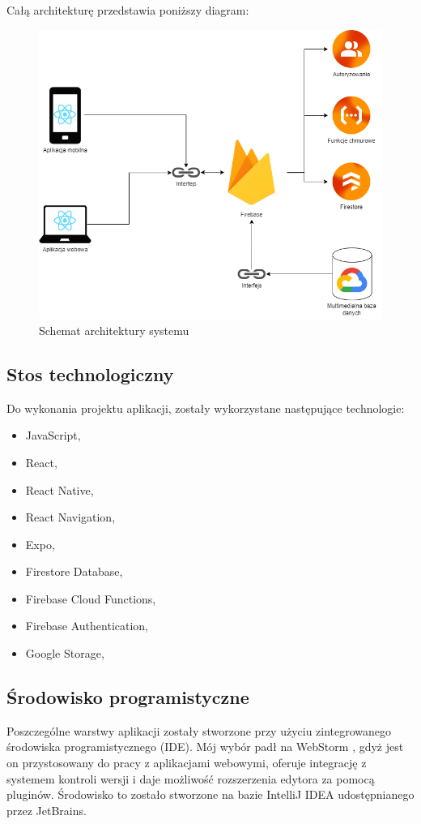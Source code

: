     Całą architekturę przedstawia poniższy diagram:
    
    \begin{figure}[H]
        \centering
        \includegraphics[width=\textwidth]{img/3/architektura.png}
        \caption{Schemat architektury systemu}
        \label{fig:architektura}
    \end{figure}

    \subsection{Stos technologiczny}
    Do wykonania projektu aplikacji, zostały wykorzystane następujące technologie:
    \begin{itemize}
        \item JavaScript,
        \item React,
        \item React Native,
        \item React Navigation,
        \item Expo,
        \item Firestore Database,
        \item Firebase Cloud Functions,
        \item Firebase Authentication,
        \item Google Storage,
    \end{itemize}

    \subsection{Środowisko programistyczne}
    Poszczególne warstwy aplikacji zostały stworzone przy użyciu zintegrowanego środowiska programistycznego (IDE). Mój wybór padł na WebStorm \cite{WebStorm}, gdyż jest on przystosowany do pracy z aplikacjami webowymi, oferuje integrację z systemem kontroli wersji i daje możliwość rozszerzenia edytora za pomocą pluginów. Środowisko to zostało stworzone na bazie IntelliJ IDEA udostępnianego przez JetBrains. \\
    
